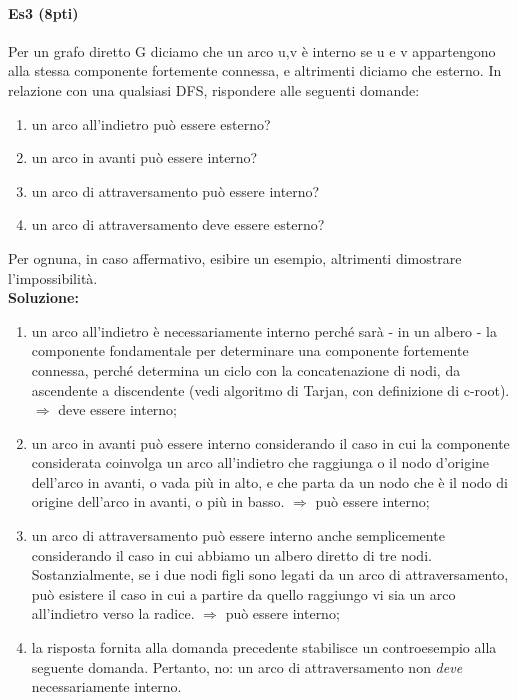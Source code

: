 \paragraph{Es3 (8pti)}
Per un grafo diretto G diciamo che un arco {u,v} è interno se u e v appartengono alla stessa componente fortemente connessa, e altrimenti diciamo che esterno. In relazione con una qualsiasi DFS, rispondere alle seguenti domande:
\begin{enumerate}
	\item un arco all'indietro può essere esterno?
	\item un arco in avanti può essere interno?
	\item un arco di attraversamento può essere interno?
	\item un arco di attraversamento deve essere esterno?
\end{enumerate}
Per ognuna, in caso affermativo, esibire un esempio, altrimenti dimostrare l'impossibilità. \\
\textbf{Soluzione:}
\begin{enumerate}
	\item un arco all'indietro è necessariamente interno perché sarà - in un albero - la componente fondamentale per determinare una componente fortemente connessa, perché determina un ciclo con la concatenazione di nodi, da ascendente a discendente (vedi algoritmo di Tarjan, con definizione di c-root). $\Rightarrow$  deve essere interno;
	\item un arco in avanti può essere interno considerando il caso in cui la componente considerata coinvolga un arco all'indietro che raggiunga o il nodo d'origine dell'arco in avanti, o vada più in alto, e che parta da un nodo che è il nodo di origine dell'arco in avanti, o più in basso. $\Rightarrow$ può essere interno;
	\item un arco di attraversamento può essere interno anche semplicemente considerando il caso in cui abbiamo un albero diretto di tre nodi. Sostanzialmente, se i due nodi figli sono legati da un arco di attraversamento, può esistere il caso in cui a partire da quello raggiungo vi sia un arco all'indietro verso la radice. $\Rightarrow$ può essere interno;
	\item la risposta fornita alla domanda precedente stabilisce un controesempio alla seguente domanda. Pertanto, no: un arco di attraversamento non \textit{deve} necessariamente interno.
\end{enumerate}
\newpage

